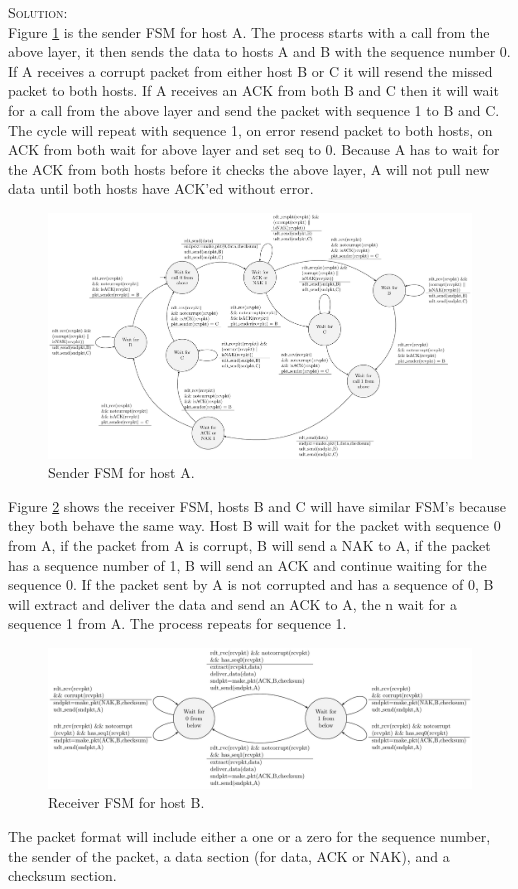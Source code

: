 \documentclass[12pt]{article}
\newenvironment{solution}
    {\textsc{Solution:}\\}
    {\newpage}%
\begin{document}
	\begin{solution}
		Figure \ref{fig:snd} is the sender FSM for host A. The process starts with a call from
		the above layer, it then sends the data to hosts A and B
		with the sequence number 0. If A receives a corrupt packet from either host B or C it will
		resend the missed packet to both hosts. If A receives an ACK from both B and C then it will
		wait for a call from the above layer and send the packet with sequence 1 to B and C.
		The cycle will repeat with sequence 1, on error resend packet to both hosts, on ACK from
		both wait for above layer and set seq to 0.
		Because A has to wait for the ACK from both hosts before it checks the above layer, A
		will not pull new data until both hosts have ACK'ed without error.
		
		\begin{figure}[ht!]
			\centering
			\includegraphics[width=\textwidth]{final_project_snd_fsm.pdf}
			\caption{Sender FSM for host A.}
			\label{fig:snd}
		\end{figure}

		Figure \ref{fig:rcv} shows the receiver FSM, hosts B and C will have similar FSM's 
		because they both behave the same way. Host B will wait for the packet with sequence 0
		from A, if the packet from A is corrupt, B will send a NAK to A, if the packet has a
		sequence number of 1, B will send an ACK and continue waiting for the sequence 0. If
		the packet sent by A is not corrupted and has a sequence of 0, B will extract and
		deliver the data and send an ACK to A, the n wait for a sequence 1 from A. The process
		repeats for sequence 1.

		\begin{figure}[ht!]
			\centering
			\includegraphics[width=\textwidth]{final_project_rcv_fsm.pdf}
			\caption{Receiver FSM for host B.}
			\label{fig:rcv}
		\end{figure}
		
		The packet format will include either a one or a zero for the sequence number, the sender of the packet, a data section (for data, ACK or NAK), and a checksum section.
	\end{solution}
\end{document}
